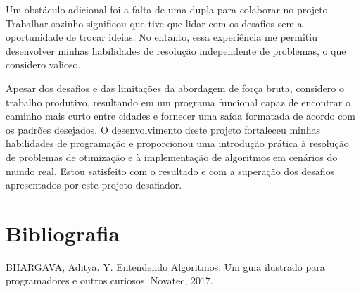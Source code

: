 \documentclass[12pt]{spieman}
\begin{document}
Um obstáculo adicional foi a falta de uma dupla para colaborar no projeto. Trabalhar sozinho significou que tive que lidar com os desafios sem a oportunidade de trocar ideias. No entanto, essa experiência me permitiu desenvolver minhas habilidades de resolução independente de problemas, o que considero valioso.


Apesar dos desafios e das limitações da abordagem de força bruta, considero o trabalho produtivo, resultando em um programa funcional capaz de encontrar o caminho mais curto entre cidades e fornecer uma saída formatada de acordo com os padrões desejados. O desenvolvimento deste projeto fortaleceu minhas habilidades de programação e proporcionou uma introdução prática à resolução de problemas de otimização e à implementação de algoritmos em cenários do mundo real. Estou satisfeito com o resultado e com a superação dos desafios apresentados por este projeto desafiador.

\section{Bibliografia}
BHARGAVA, Aditya. Y. Entendendo Algoritmos: Um guia ilustrado para programadores e outros curiosos. Novatec, 2017.
\end{document}
